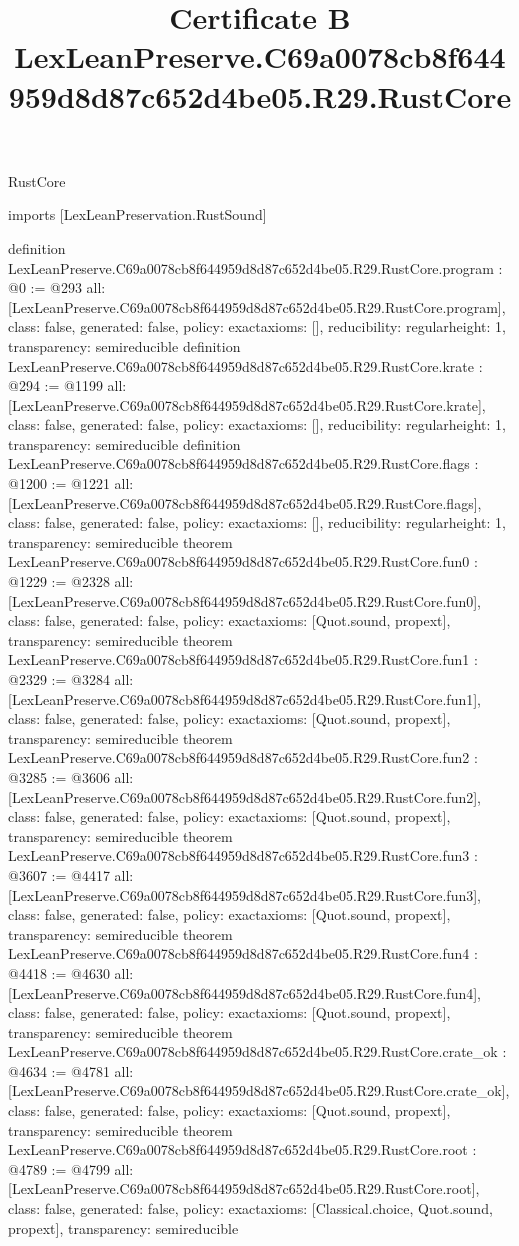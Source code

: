 \begin{lexlean}{RustCore}
\title{Certificate B LexLeanPreserve.C69a0078cb8f644959d8d87c652d4be05.R29.RustCore}
\begin{coremodule}
imports [LexLeanPreservation.RustSound]

definition LexLeanPreserve.C69a0078cb8f644959d8d87c652d4be05.R29.RustCore.program : @0 := @293 {
  all: [LexLeanPreserve.C69a0078cb8f644959d8d87c652d4be05.R29.RustCore.program],
  class: false,
  generated: false,
  policy: exact{axioms: []},
  reducibility: regular{height: 1},
  transparency: semireducible
}
definition LexLeanPreserve.C69a0078cb8f644959d8d87c652d4be05.R29.RustCore.krate : @294 := @1199 {
  all: [LexLeanPreserve.C69a0078cb8f644959d8d87c652d4be05.R29.RustCore.krate],
  class: false,
  generated: false,
  policy: exact{axioms: []},
  reducibility: regular{height: 1},
  transparency: semireducible
}
definition LexLeanPreserve.C69a0078cb8f644959d8d87c652d4be05.R29.RustCore.flags : @1200 := @1221 {
  all: [LexLeanPreserve.C69a0078cb8f644959d8d87c652d4be05.R29.RustCore.flags],
  class: false,
  generated: false,
  policy: exact{axioms: []},
  reducibility: regular{height: 1},
  transparency: semireducible
}
theorem LexLeanPreserve.C69a0078cb8f644959d8d87c652d4be05.R29.RustCore.fun0 : @1229 := @2328 {
  all: [LexLeanPreserve.C69a0078cb8f644959d8d87c652d4be05.R29.RustCore.fun0],
  class: false,
  generated: false,
  policy: exact{axioms: [Quot.sound, propext]},
  transparency: semireducible
}
theorem LexLeanPreserve.C69a0078cb8f644959d8d87c652d4be05.R29.RustCore.fun1 : @2329 := @3284 {
  all: [LexLeanPreserve.C69a0078cb8f644959d8d87c652d4be05.R29.RustCore.fun1],
  class: false,
  generated: false,
  policy: exact{axioms: [Quot.sound, propext]},
  transparency: semireducible
}
theorem LexLeanPreserve.C69a0078cb8f644959d8d87c652d4be05.R29.RustCore.fun2 : @3285 := @3606 {
  all: [LexLeanPreserve.C69a0078cb8f644959d8d87c652d4be05.R29.RustCore.fun2],
  class: false,
  generated: false,
  policy: exact{axioms: [Quot.sound, propext]},
  transparency: semireducible
}
theorem LexLeanPreserve.C69a0078cb8f644959d8d87c652d4be05.R29.RustCore.fun3 : @3607 := @4417 {
  all: [LexLeanPreserve.C69a0078cb8f644959d8d87c652d4be05.R29.RustCore.fun3],
  class: false,
  generated: false,
  policy: exact{axioms: [Quot.sound, propext]},
  transparency: semireducible
}
theorem LexLeanPreserve.C69a0078cb8f644959d8d87c652d4be05.R29.RustCore.fun4 : @4418 := @4630 {
  all: [LexLeanPreserve.C69a0078cb8f644959d8d87c652d4be05.R29.RustCore.fun4],
  class: false,
  generated: false,
  policy: exact{axioms: [Quot.sound, propext]},
  transparency: semireducible
}
theorem LexLeanPreserve.C69a0078cb8f644959d8d87c652d4be05.R29.RustCore.crate_ok : @4634 := @4781 {
  all: [LexLeanPreserve.C69a0078cb8f644959d8d87c652d4be05.R29.RustCore.crate_ok],
  class: false,
  generated: false,
  policy: exact{axioms: [Quot.sound, propext]},
  transparency: semireducible
}
theorem LexLeanPreserve.C69a0078cb8f644959d8d87c652d4be05.R29.RustCore.root : @4789 := @4799 {
  all: [LexLeanPreserve.C69a0078cb8f644959d8d87c652d4be05.R29.RustCore.root],
  class: false,
  generated: false,
  policy: exact{axioms: [Classical.choice, Quot.sound, propext]},
  transparency: semireducible
}


\end{coremodule}
\end{lexlean}
